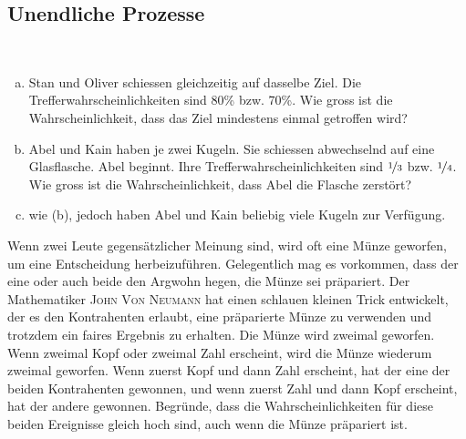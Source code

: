 \documentclass[%
11pt,%
twoside,%
titlepage,%
german,%
headsepline%
]{scrartcl}
\begin{document}
\subsection{Unendliche Prozesse}

\begin{ueb}
\ \\[-4ex]
\begin{enumerate}[a)]
\item Stan und Oliver schiessen gleichzeitig auf dasselbe Ziel. Die Trefferwahrscheinlichkeiten sind 80\% bzw. 70\%. Wie gross ist die Wahrscheinlichkeit, dass das Ziel mindestens einmal getroffen wird?
\item Abel und Kain haben je zwei Kugeln. Sie schiessen abwechselnd auf eine Glasflasche. Abel beginnt. Ihre Trefferwahrscheinlichkeiten sind $\nicefrac{1}{3}$ bzw. $\nicefrac{1}{4}$. Wie gross ist die Wahrscheinlichkeit, dass Abel die Flasche zerstört?
\item wie (b), jedoch haben Abel und Kain beliebig viele Kugeln zur Verfügung.
\end{enumerate}
\end{ueb}


Wenn zwei Leute gegensätzlicher Meinung sind, wird oft eine Münze geworfen, um eine Entscheidung herbeizuführen. Gelegentlich mag es vorkommen, dass der eine oder auch beide den Argwohn hegen, die Münze sei präpariert. Der Mathematiker \textsc{John Von Neumann} hat einen schlauen kleinen Trick entwickelt, der es den Kontrahenten erlaubt, eine präparierte Münze zu verwenden und trotzdem ein faires Ergebnis zu erhalten. Die Münze wird zweimal geworfen. Wenn zweimal Kopf oder zweimal Zahl erscheint, wird die Münze wiederum zweimal geworfen. Wenn zuerst Kopf und dann Zahl erscheint, hat der eine der beiden Kontrahenten gewonnen, und wenn zuerst Zahl und dann Kopf erscheint, hat der andere gewonnen. Begründe, dass die Wahrscheinlichkeiten für diese beiden Ereignisse gleich hoch sind, auch wenn die Münze präpariert ist.
\end{document}
